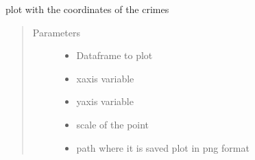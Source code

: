 \documentclass[letterpaper,10pt,english]{sphinxmanual}
\begin{document}
\begin{fulllineitems}
\label{\detokenize{index:dummy_project_utils.plot_scatterplot}}
\sphinxAtStartPar
{}

\sphinxAtStartPar
plot with the coordinates of the crimes
\begin{quote}\begin{description}
\item[{Parameters}] \leavevmode\begin{itemize}
\item {} 
\sphinxAtStartPar
{} \textendash{} Dataframe to plot

\item {} 
\sphinxAtStartPar
{} \textendash{} x\sphinxhyphen{}axis variable

\item {} 
\sphinxAtStartPar
{} \textendash{} y\sphinxhyphen{}axis variable

\item {} 
\sphinxAtStartPar
{} \textendash{} scale of the point

\item {} 
\sphinxAtStartPar
{} \textendash{} path where it is saved plot in png format

\end{itemize}

\end{description}\end{quote}

\end{fulllineitems}

\end{document}
